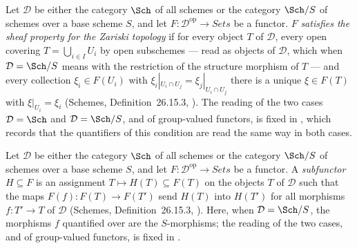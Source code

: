 
\begin{definition}
\label{def:pc-zariski-sheaf-property}
Let $\mathcal D$ be either the category $\Sch$ of all schemes or the
category $\Sch/S$ of schemes over a base scheme $S$, and let
$F:\mathcal D^{\mathrm{op}}\to\textit{Sets}$ be a functor.  $F$
\emph{satisfies the sheaf property for the Zariski topology} if for every
object $T$ of $\mathcal D$, every open covering $T=\bigcup_{i\in I}U_i$ by
open subschemes --- read as objects of $\mathcal D$, which when
$\mathcal D=\Sch/S$ means with the restriction of the structure morphism of
$T$ --- and every collection $\xi_i\in F(U_i)$ with
$\xi_i|_{U_i\cap U_j}=\xi_j|_{U_i\cap U_j}$ there is a unique
$\xi\in F(T)$ with $\xi|_{U_i}=\xi_i$ (Schemes, Definition~26.15.3,
).
The reading of the two cases $\mathcal D=\Sch$ and $\mathcal D=\Sch/S$, and
of group-valued functors, is fixed in
, which records that the quantifiers of
this condition are read the same way in both cases.
\end{definition}

\begin{definition}[Subfunctors]\label{def:pc-subfunctor}
Let $\mathcal D$ be either the category $\Sch$ of all schemes or the
category $\Sch/S$ of schemes over a base scheme $S$, and let
$F:\mathcal D^{\mathrm{op}}\to\textit{Sets}$ be a functor.  A
\emph{subfunctor} $H\subseteq F$ is an assignment
$T\mapsto H(T)\subseteq F(T)$ on the objects $T$ of $\mathcal D$ such
that the maps $F(f):F(T)\to F(T')$ send $H(T)$ into $H(T')$ for all
morphisms $f:T'\to T$ of $\mathcal D$ (Schemes, Definition~26.15.3,
).
Here, when $\mathcal D=\Sch/S$, the morphisms $f$ quantified over are the
$S$-morphisms; the reading of the two cases, and of group-valued functors, is
fixed in .
\end{definition}

